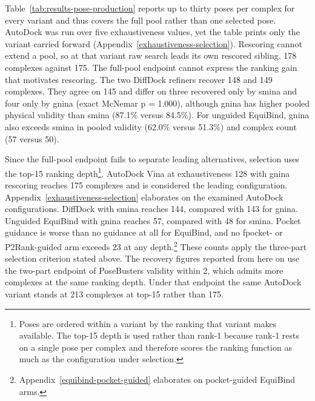 Table~\ref{tab:results-pose-production} reports up to thirty poses per complex for every variant and thus covers the full pool rather than one selected pose. AutoDock was run over five exhaustiveness values, yet the table prints only the variant carried forward (Appendix~\ref{exhaustiveness-selection}). Rescoring cannot extend a pool, so at that variant raw search leads its own rescored sibling, 178 complexes against 175. The full-pool endpoint cannot express the ranking gain that motivates rescoring. The two DiffDock refiners recover 148 and 149 complexes. They agree on 145 and differ on three recovered only by smina and four only by gnina (exact McNemar p = 1.000), although gnina has higher pooled physical validity than smina (87.1\% versus 84.5\%). For unguided EquiBind, gnina also exceeds smina in pooled validity (62.0\% versus 51.3\%) and complex count (57 versus 50).

Since the full-pool endpoint fails to separate leading alternatives, selection uses the top-15 ranking depth\footnote{Poses are ordered within a variant by the ranking that variant makes available. The top-15 depth is used rather than rank-1 because rank-1 rests on a single pose per complex and therefore scores the ranking function as much as the configuration under selection.}. AutoDock Vina at exhaustiveness 128 with gnina rescoring reaches 175 complexes and is considered the leading configuration. Appendix~\ref{exhaustiveness-selection} elaborates on the examined AutoDock configurations. DiffDock with smina reaches 144, compared with 143 for gnina. Unguided EquiBind with gnina reaches 57, compared with 48 for smina. Pocket guidance is worse than no guidance at all for EquiBind, and no fpocket- or P2Rank-guided arm exceeds 23 at any depth.\footnote{Appendix~\ref{equibind-pocket-guided} elaborates on pocket-guided EquiBind arms.} These counts apply the three-part selection criterion stated above. The recovery figures reported from here on use the two-part endpoint of PoseBusters validity within 2\angstrom{}, which admits more complexes at the same ranking depth. Under that endpoint the same AutoDock variant stands at 213 complexes at top-15 rather than 175.

